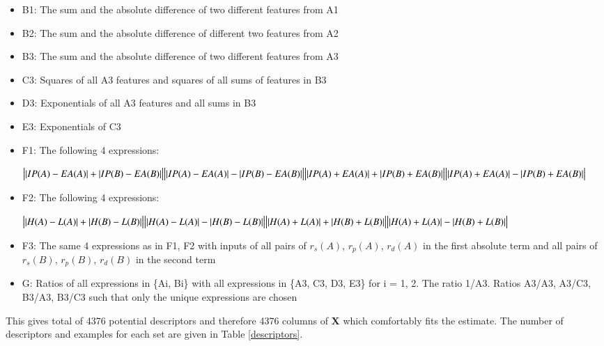 \documentclass[11pt,oneside,czech,american]{book} %
\theoremstyle{definition} %
\theoremstyle{definition}
\renewcommand{\vec}[1]{\boldsymbol{#1}}
\begin{document}
\begin{itemize}
	\item B1: The sum and the absolute difference of two different features from A1
	\item B2: The sum and the absolute difference of different two features from A2
	\item B3: The sum and the absolute difference of two different features from A3
	\item C3: Squares of all A3 features and squares of all sums of features in B3
	\item D3: Exponentials of all A3 features and all sums in B3
	\item E3: Exponentials of C3
	\item F1: The following 4 expressions:
	
	\begin{center}
		$\big||IP(A)-EA(A)|+|IP(B)-EA(B)|\big| \newline
		\big||IP(A)-EA(A)|-|IP(B)-EA(B)|\big| \newline
		\big||IP(A)+EA(A)|+|IP(B)+EA(B)|\big| \newline
		\big||IP(A)+EA(A)|-|IP(B)+EA(B)|\big| \newline$
	\end{center}
	\item F2: The following 4 expressions:
	
	\begin{center}
		$\big||H(A)-L(A)|+|H(B)-L(B)|\big| \newline
		\big||H(A)-L(A)|-|H(B)-L(B)|\big| \newline
		\big||H(A)+L(A)|+|H(B)+L(B)|\big| \newline
		\big||H(A)+L(A)|-|H(B)+L(B)|\big| \newline$
	\end{center}
	\item F3: The same 4 expressions as in F1, F2 with inputs of all pairs of $r_{s}(A)$, $r_{p}(A)$, $r_{d}(A)$ in the first absolute term and all pairs of $r_{s}(B)$, $r_{p}(B)$, $r_{d}(B)$ in the second term
	
	\item G: Ratios of all expressions in \{Ai, Bi\} with all expressions in \{A3, C3, D3, E3\} for i = 1, 2. The ratio 1/A3. Ratios A3/A3, A3/C3, B3/A3, B3/C3 such that only the unique expressions are chosen
\end{itemize}

This gives total of 4376 potential descriptors and therefore 4376 columns of $\vec{X}$ which comfortably fits the estimate. The number of descriptors and examples for each set are given in Table \ref{descriptors}.
\end{document}
